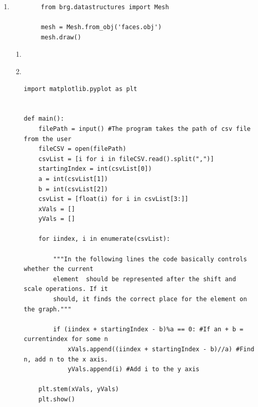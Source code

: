\documentclass[10pt,a4paper, margin=1in]{article}
\begin{document}
\begin{enumerate}
    \item %
          \begin{lstlisting}
        from brg.datastructures import Mesh
         
        mesh = Mesh.from_obj('faces.obj')
        mesh.draw()
        \end{lstlisting}
          \begin{enumerate}
                \item %
                \item~\\
                    \lstset{language=Python}
                    \lstset{frame=single}
                    \lstset{basicstyle=\footnotesize}
                    \begin{lstlisting}
import matplotlib.pyplot as plt


def main():
    filePath = input() #The program takes the path of csv file from the user
    fileCSV = open(filePath)
    csvList = [i for i in fileCSV.read().split(",")]
    startingIndex = int(csvList[0])
    a = int(csvList[1])
    b = int(csvList[2])
    csvList = [float(i) for i in csvList[3:]]
    xVals = []
    yVals = []

    for iindex, i in enumerate(csvList):

        """In the following lines the code basically controls whether the current
        element  should be represented after the shift and scale operations. If it 
        should, it finds the correct place for the element on the graph."""
        
        if (iindex + startingIndex - b)%a == 0: #If an + b = currentindex for some n
            xVals.append((iindex + startingIndex - b)//a) #Find n, add n to the x axis.
            yVals.append(i) #Add i to the y axis

    plt.stem(xVals, yVals)
    plt.show()



\end{lstlisting}
\end{enumerate}
\end{enumerate}
\end{document}
